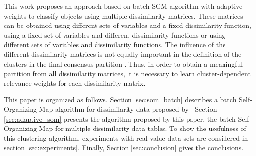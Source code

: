 \documentclass[10pt, conference, compsocconf]{IEEEtran}
\begin{document}
This work proposes an approach based on batch SOM algorithm with adaptive weights to classify objects using multiple dissimilarity matrices. These matrices can be obtained using different sets of variables and a fixed dissimilarity function,
using a fixed set of variables and different dissimilarity functions 
or using different sets of variables and dissimilarity functions. The influence of the different dissimilarity matrices is not equally important in the definition of the clusters in the final consensus partition \cite{Frigui:2007}. Thus, in order to obtain a meaningful partition from all dissimilarity matrices, it is necessary to learn cluster-dependent relevance weights for each dissimilarity matrix.

This paper is organized as follows. 
Section \ref{sec:som_batch} describes a batch Self-Organizing Map algorithm for dissimilarity data proposed by \cite{golli:2004}. Section \ref{sec:adaptive_som} presents the algorithm proposed by this paper, the batch Self-Organizing Map for multiple dissimilarity data tables. To show the usefulness of this clustering algorithm, experiments with real-value data sets are considered in section \ref{sec:experiments}. Finally, Section \ref{sec:conclusion} gives the conclusions.
\end{document}

